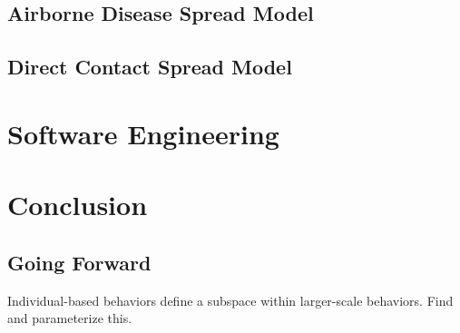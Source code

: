 \documentclass{article}
\begin{document}
\subsection{Airborne Disease Spread Model}


\subsection{Direct Contact Spread Model}


\section{Software Engineering}

\section{Conclusion}
\subsection{Going Forward}
Individual-based behaviors define a subspace within larger-scale
behaviors. Find and parameterize this.
\end{document}
